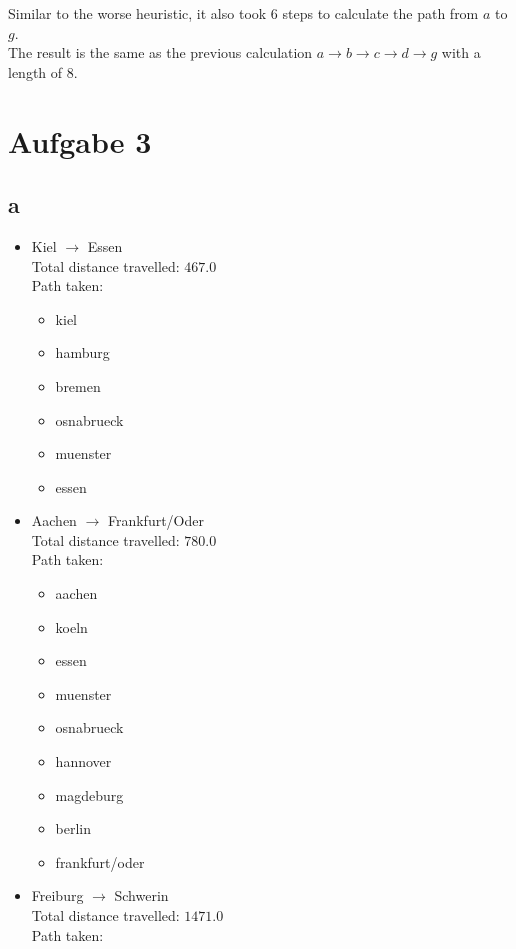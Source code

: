 \documentclass[a4paper]{article}
\begin{document}
\noindent Similar to the worse heuristic, it also took 6 steps to calculate the path from $a$ to $g$. \\ 
The result is the same as the previous calculation $a \rightarrow b \rightarrow c \rightarrow d \rightarrow g$ with a length of 8.



\section*{Aufgabe 3} %
\subsection*{a} 
	\begin{itemize}
		\item Kiel $\rightarrow$ Essen \\
			Total distance travelled: $467.0$ \\
			Path taken: \begin{itemize}
				\item kiel
				\item hamburg
				\item bremen
				\item osnabrueck
				\item muenster
				\item essen
			\end{itemize}
		\item Aachen $\rightarrow$ Frankfurt/Oder \\
			Total distance travelled: $780.0$ \\
			Path taken: 
			\begin{itemize}
				\item aachen
				\item koeln
				\item essen
				\item muenster
				\item osnabrueck
				\item hannover
				\item magdeburg
				\item berlin
				\item frankfurt/oder
			\end{itemize}
		\item Freiburg $\rightarrow$ Schwerin \\
		Total distance travelled: $1471.0$ \\
		Path taken: 
		\begin{itemize}

\end{itemize}
\end{itemize}
\end{document}
